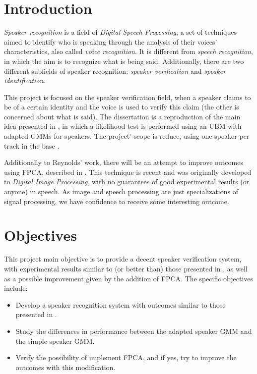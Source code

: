 \documentclass[a4paper,twocolumn]{article}
\begin{document}
\section{Introduction}
\label{ch:intro}

\textit{Speaker recognition} is a field of \textit{Digital Speech Processing}, a set of techniques aimed to identify who is speaking through the analysis of their voices' characteristics, also called \textit{voice recognition}. It is different from \textit{speech recognition}, in which the aim is to recognize what is being said. Additionally, there are two different subfields of speaker recognition: \textit{speaker verification} and \textit{speaker identification}.

This project is focused on the speaker verification field, when a speaker claims to be of a certain identity and the voice is used to verify this claim (the other is concerned about what is said). The dissertation is a reproduction of the main idea presented in \cite{reynolds_et_al_2000}, in which a likelihood test is performed using an UBM with adapted GMMs for speakers. The project' scope is reduce, using one speaker per track in the base \cite{corpus_paper}.

Additionally to Reynolds' work, there will be an attempt to improve outcomes using FPCA, described in \cite{gao_et_al_2013}. This technique is recent and was originally developed to \textit{Digital Image Processing}, with no guarantees of good experimental results (or anyone) in speech. As image and speech processing are just specializations of signal processing, we have confidence to receive some interesting outcome.


\section{Objectives}
\label{ch:objectives}

This project main objective is to provide a decent speaker verification system, with experimental results similar to (or better than) those presented in \cite{reynolds_et_al_2000}, as well as a possible improvement given by the addition of FPCA. The specific objectives include:

\begin{itemize}[noitemsep]
    \item Develop a speaker recognition system with outcomes similar to those presented in \cite{reynolds_et_al_2000}.
    \item Study the differences in performance between the adapted speaker GMM and the simple speaker GMM.
    \item Verify the possibility of implement FPCA, and if yes, try to improve the outcomes with this modification.
\end{itemize}
\end{document}
